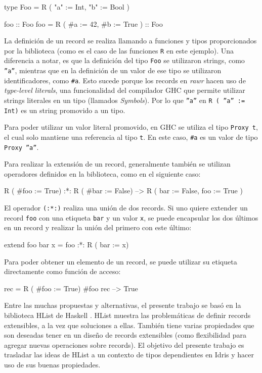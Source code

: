\begin{code}
type Foo = R ( "a" := Int, "b" := Bool )

foo :: Foo
foo = R ( #a := 42, #b := True ) :: Foo
\end{code}

La definición de un record se realiza llamando a funciones y tipos proporcionados por la biblioteca (como es el caso de las funciones \texttt{R} en este ejemplo). Una diferencia a notar, es que la definición del tipo \texttt{Foo} se utilizaron strings, como \texttt{''a''}, mientras que en la definición de un valor de ese tipo se utilizaron identificadores, como \texttt{\#a}. Esto sucede porque los records en \textit{rawr} hacen uso de \textit{type-level literals}, una funcionalidad del compilador GHC que permite utilizar strings literales en un tipo (llamados \textit{Symbols}). Por lo que \texttt{''a''} en \texttt{R ( ''a'' := Int)} es un string promovido a un tipo. 

Para poder utilizar un valor literal promovido, en GHC se utiliza el tipo \texttt{Proxy t}, el cual solo mantiene una referencia al tipo \texttt{t}. En este caso, \texttt{\#a} es un valor de tipo \texttt{Proxy ''a''}.

Para realizar la extensión de un record, generalmente también se utilizan operadores definidos en la biblioteca, como en el siguiente caso:

\begin{code}
R ( #foo := True) :*: R ( #bar := False)
--> R ( bar := False, foo := True )
\end{code}

El operador \texttt{(:*:)} realiza una unión de dos records. Si uno quiere extender un record \texttt{foo} con una etiqueta \texttt{bar} y un valor \texttt{x}, se puede encapsular los dos últimos en un record y realizar la unión del primero con este último:

\begin{code}
extend foo bar x = foo :*: R ( bar := x)
\end{code}

Para poder obtener un elemento de un record, se puede utilizar su etiqueta directamente como función de acceso:

\begin{code}
rec = R ( #foo := True)
#foo rec
--> True
\end{code}

Entre las muchas propuestas y alternativas, el presente trabajo se basó en la biblioteca HList de Haskell \cite{HListHackage}. HList muestra las problemáticas de definir records extensibles, a la vez que soluciones a ellas. También tiene varias propiedades que son deseadas tener en un diseño de records extensibles (como flexibilidad para agregar nuevas operaciones sobre records). El objetivo del presente trabajo es trasladar las ideas de HList a un contexto de tipos dependientes en Idris y hacer uso de sus buenas propiedades.

